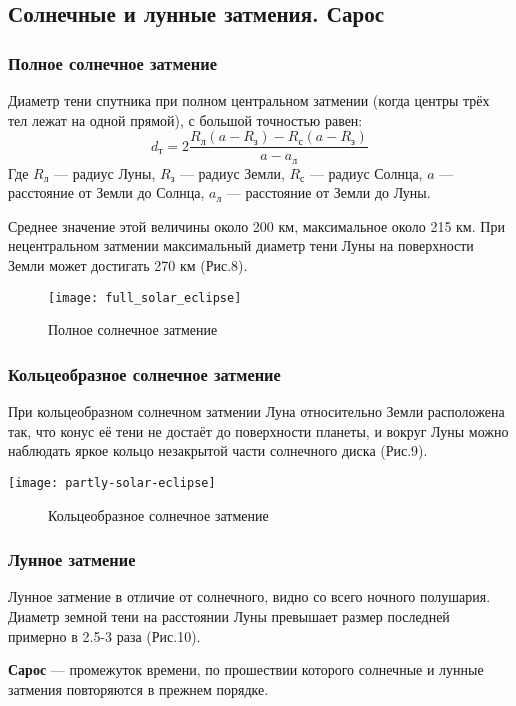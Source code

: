 \subsection{Солнечные и лунные затмения. Сарос}
\subsubsection{Полное солнечное затмение}
Диаметр тени спутника при полном центральном затмении (когда центры трёх тел лежат на одной прямой), с большой точностью равен:
$$d_\text{т}=2\frac{R_\text{л}(a-R_\text{з})-R_\text{с}(a-R_\text{з})}{a-a_\text{л}}$$
Где $R_\text{л}$ --- радиус Луны, $R_\text{з}$ --- радиус Земли, $R_\text{с}$ --- радиус Солнца, $a$ --- расстояние от Земли до Солнца, $a_\text{л}$ --- расстояние от Земли до Луны.

Среднее значение  этой величины около 200 км, максимальное около 215 км. При нецентральном затмении максимальный диаметр тени Луны на поверхности Земли может достигать 270 км (Рис.8).

\begin{figure}[h!]
\texttt{[image: full\_solar\_eclipse]}
\caption{Полное солнечное затмение}
\end{figure}

\subsubsection{Кольцеобразное солнечное затмение}
При кольцеобразном солнечном затмении Луна относительно Земли расположена так, что конус её тени не достаёт до поверхности планеты, и вокруг Луны можно наблюдать яркое кольцо незакрытой части солнечного диска (Рис.9).
\begin{center}
\texttt{[image: partly-solar-eclipse]}
\begin{figure}[h!]
\caption{Кольцеобразное солнечное затмение}
\end{figure}
\end{center}
\subsubsection{Лунное затмение}

Лунное затмение в отличие от солнечного, видно со всего ночного полушария. Диаметр земной тени на расстоянии Луны превышает размер последней примерно в 2.5-3 раза (Рис.10).

\textbf{Сарос} --- промежуток  времени, по прошествии которого солнечные и лунные затмения повторяются в прежнем порядке.

